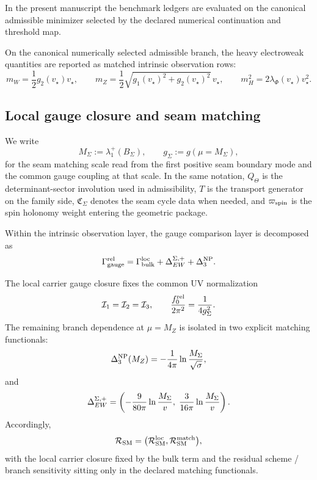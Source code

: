 \begin{principle}
In the present manuscript the benchmark ledgers are evaluated on the canonical admissible
minimizer selected by the declared numerical continuation and threshold map.
\end{principle}

\begin{corollary}
\label{cor:intrinsic-threshold-outputs}
On the canonical numerically selected admissible branch, the heavy electroweak quantities are
reported as matched intrinsic observation rows:
\[
m_W=\frac12 g_2(v_\star)v_\star,
\qquad
m_Z=\frac12\sqrt{g_1(v_\star)^2+g_2(v_\star)^2}\,v_\star,
\qquad
m_H^2=2\lambda_\Phi(v_\star)v_\star^2.
\]
\end{corollary}

\subsection{Local gauge closure and seam matching}

\begin{definition}
We write
\[
M_\Sigma:=\lambda_1^+(B_\Sigma),
\qquad
g_\Sigma:=g(\mu=M_\Sigma),
\]
for the seam matching scale read from the first positive seam boundary mode and the common gauge coupling at that scale. In the same notation, $Q_\Theta$ is the determinant-sector involution used in admissibility, $T$ is the transport generator on the family side, $\mathfrak C_\Sigma$ denotes the seam cycle data when needed, and $\varpi_{\mathrm{spin}}$ is the spin holonomy weight entering the geometric package.
\end{definition}

Within the intrinsic observation layer, the gauge comparison layer is decomposed as
\begin{equation}
\label{eq:relative-gauge-split}
\Gamma_{\mathrm{gauge}}^{\mathrm{rel}}
=
\Gamma_{\mathrm{bulk}}^{\mathrm{loc}}
+
\Delta_{EW}^{\Sigma,+}
+
\Delta_3^{\mathrm{NP}}.
\end{equation}

\begin{proposition}
\label{prop:local-gauge-closure-matching}
The local carrier gauge closure fixes the common UV normalization
\[
\mathcal I_1=\mathcal I_2=\mathcal I_3,
\qquad
\frac{f_0^{\mathrm{rel}}}{2\pi^2}=\frac{1}{4g_\Sigma^2}.
\]
The remaining branch dependence at $\mu=M_Z$ is isolated in two explicit matching functionals:
\[
\Delta_3^{\mathrm{NP}}(M_Z)
=
-\frac{1}{4\pi}\ln\frac{M_\Sigma}{\sqrt{\sigma}},
\]
and
\[
\Delta_{EW}^{\Sigma,+}
=
\left(
-\frac{9}{80\pi}\ln\frac{M_\Sigma}{v},
\;
\frac{3}{16\pi}\ln\frac{M_\Sigma}{v}
\right).
\]
Accordingly,
\[
\mathcal R_{\mathrm{SM}}
=
\bigl(\mathcal R_{\mathrm{SM}}^{\mathrm{loc}},\mathcal R_{\mathrm{SM}}^{\mathrm{match}}\bigr),
\]
with the local carrier closure fixed by the bulk term and the residual scheme / branch sensitivity sitting only in the declared matching functionals.
\end{proposition}

